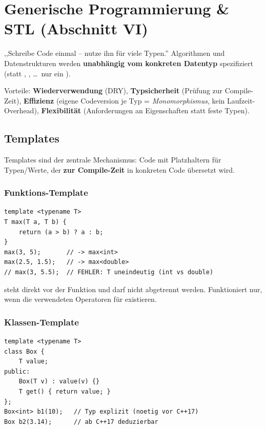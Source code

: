 \section{Generische Programmierung \& STL (Abschnitt VI)}
\begin{definition}
,,Schreibe Code einmal -- nutze ihn f\"ur viele Typen.'' Algorithmen und Datenstrukturen werden \textbf{unabh\"angig vom konkreten Datentyp} spezifiziert (statt , , \dots\ nur ein ).
\end{definition}
Vorteile: \textbf{Wiederverwendung} (DRY), \textbf{Typsicherheit} (Pr\"ufung zur Compile-Zeit), \textbf{Effizienz} (eigene Codeversion je Typ = \emph{Monomorphismus}, kein Laufzeit-Overhead), \textbf{Flexibilit\"at} (Anforderungen an Eigenschaften statt feste Typen).

\subsection{Templates}
Templates sind der zentrale Mechanismus: Code mit Platzhaltern f\"ur Typen/Werte, der \textbf{zur Compile-Zeit} in konkreten Code \"ubersetzt wird.

\subsubsection*{Funktions-Template}
\begin{lstlisting}
template <typename T>
T max(T a, T b) {
    return (a > b) ? a : b;
}
max(3, 5);       // -> max<int>
max(2.5, 1.5);   // -> max<double>
// max(3, 5.5);  // FEHLER: T uneindeutig (int vs double)
\end{lstlisting}
 steht direkt vor der Funktion und darf nicht abgetrennt werden. Funktioniert nur, wenn die verwendeten Operatoren f\"ur  existieren.

\subsubsection*{Klassen-Template}
\begin{lstlisting}
template <typename T>
class Box {
    T value;
public:
    Box(T v) : value(v) {}
    T get() { return value; }
};
Box<int> b1(10);   // Typ explizit (noetig vor C++17)
Box b2(3.14);      // ab C++17 deduzierbar
\end{lstlisting}

